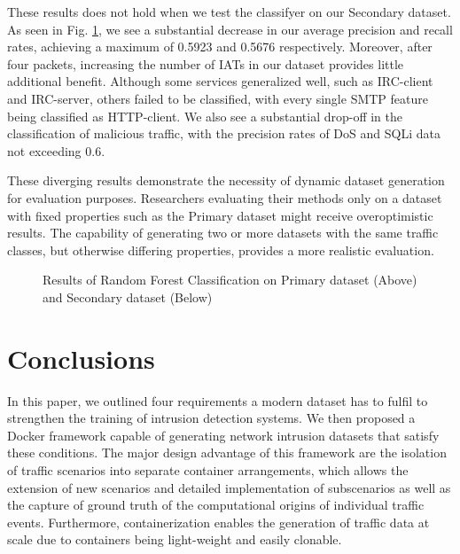These results does not hold when we test the classifyer on our Secondary dataset. As seen in Fig. \ref{Fig:Primary}, we see a substantial decrease in our average precision and recall rates, achieving a maximum of 0.5923 and 0.5676 respectively. Moreover, after four packets, increasing the number of IATs in our dataset provides little additional benefit. Although some services generalized well, such as IRC-client and IRC-server, others failed to be classified, with every single SMTP feature being classified as HTTP-client. We also see a substantial drop-off in the classification of malicious traffic, with the precision rates of DoS and SQLi data not exceeding 0.6.

These diverging results demonstrate the necessity of dynamic dataset generation for evaluation purposes. Researchers evaluating their methods only on a dataset with fixed properties such as the Primary dataset might receive overoptimistic results. The capability of generating two or more datasets with the same traffic classes, but otherwise differing properties, provides a more realistic evaluation.


\begin{figure}%



\caption{Results of Random Forest Classification on Primary dataset (Above) and Secondary dataset (Below)}
\label{Fig:Primary}
\end{figure}


\section{Conclusions}\label{Sec:Conclusion}

In this paper, we outlined four requirements a modern dataset has to fulfil to strengthen the training of intrusion detection systems. We then proposed a Docker framework capable of generating network intrusion datasets that satisfy these conditions. The major design advantage of this framework are the isolation of traffic scenarios into separate container arrangements, which allows the extension of new scenarios and detailed implementation of subscenarios as well as the capture of ground truth of the computational origins of individual traffic events. Furthermore, containerization enables the generation of traffic data at scale due to containers being light-weight and easily clonable.

